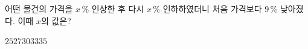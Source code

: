 어떤 물건의 가격을 $x\,\%$ 인상한 후 다시 $x\,\%$ 인하하였더니 처음 가격보다 $9\,\%$ 낮아졌다. 이때 $x$의 값은? 
\begin{choices32}{$25$}{$27$}{$30$}{$33$}{$35$}\end{choices32}
